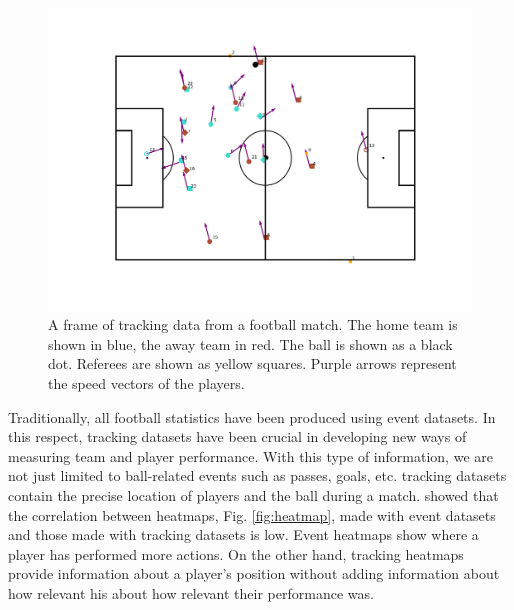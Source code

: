 \documentclass[
  twoside,nohyper]{book}
\begin{document}
\begin{figure}[H]

{\centering \includegraphics[width=0.8\linewidth,]{imagenes/Frame} 

}

\caption{A frame of tracking data from a football match. The home team is shown in blue, the away team in red. The ball is shown as a black dot. Referees are shown as yellow squares. Purple arrows represent the speed vectors of the players.}\label{fig:frame}
\end{figure}

Traditionally, all football statistics have been produced using event datasets. In this respect, tracking datasets have been crucial in developing new ways of measuring team and player performance. With this type of information, we are not just limited to ball-related events such as passes, goals, etc. tracking datasets contain the precise location of players and the ball during a match. \citep{GARRIDO2022112827} showed that the correlation between heatmaps, Fig. \ref{fig:heatmap}, made with event datasets and those made with tracking datasets is low. Event heatmaps show where a player has performed more actions. On the other hand, tracking heatmaps provide information about a player's position without adding information about how relevant his about how relevant their performance was.
\end{document}
